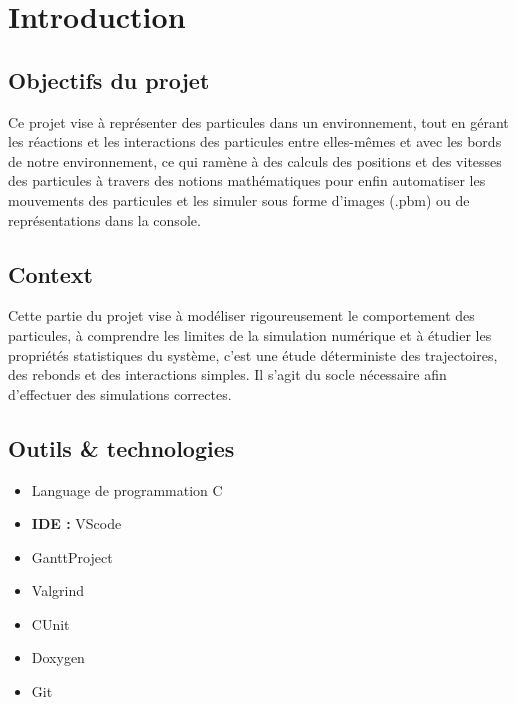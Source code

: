 \documentclass[12pt,a4paper]{report}
\begin{document}
\tableofcontents
\newpage

\chapter{Introduction}

\section{Objectifs du projet}

Ce projet vise à représenter des particules dans un environnement, tout en gérant les réactions et les interactions des particules entre elles-mêmes et avec les bords de notre environnement, ce qui ramène à des calculs des positions et des vitesses des particules à travers des notions mathématiques pour enfin automatiser les mouvements des particules et les simuler sous forme d’images (.pbm) ou de représentations dans la console.

\section{Context}

Cette partie du projet vise à modéliser rigoureusement le comportement des particules, à comprendre les limites de la simulation numérique et à étudier les propriétés statistiques du système, c'est une étude déterministe des trajectoires, des rebonds et des interactions simples. Il s'agit du socle nécessaire afin d'effectuer des simulations correctes.

\section{Outils \& technologies}

\begin{itemize}
    \item Language de programmation C
    \item \textbf{IDE : } VScode
    \item GanttProject
    \item Valgrind
    \item CUnit
    \item Doxygen
    \item Git
\end{itemize}
\end{document}
